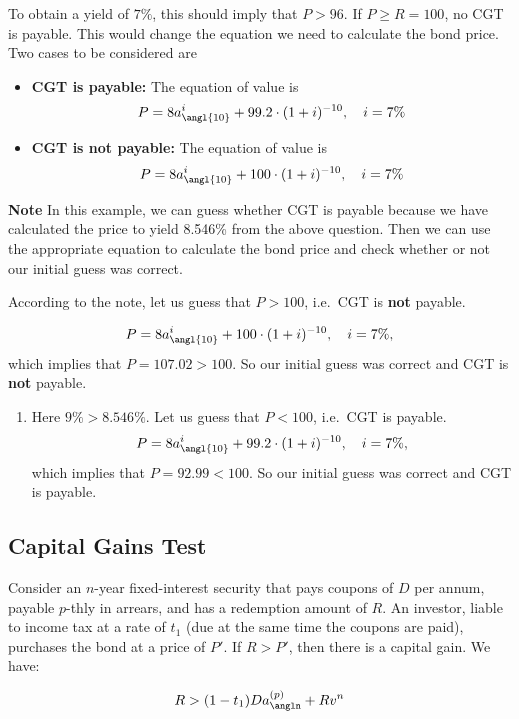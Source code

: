 \documentclass[
]{book}
\providecommand{\tightlist}{%
  \setlength{\itemsep}{0pt}\setlength{\parskip}{0pt}}
\theoremstyle{definition}
\theoremstyle{definition}
\theoremstyle{definition}
\theoremstyle{definition}
\theoremstyle{remark}
\begin{document}
To obtain a yield of \(7\%\), this should imply that \(P > 96\). If
\(P \ge R = 100\), no CGT is payable. This would change the equation we
need to calculate the bond price. Two cases to be considered are

\begin{itemize}
\item
  \textbf{CGT is payable:} The equation of value is
  \[ P = 8 a^i_{\angl{10}} +  99.2\cdot (1+i)^{-10}, \quad i = 7\%\]
\item
  \textbf{CGT is not payable:} The equation of value is
  \[ P = 8 a^i_{\angl{10}} +  100\cdot (1+i)^{-10}, \quad i = 7\%\]
\end{itemize}

\textbf{Note} In this example, we can guess whether CGT is payable because we
have calculated the price to yield 8.546\% from the above question. Then
we can use the appropriate equation to calculate the bond price and
check whether or not our initial guess was correct.

According to the note, let us guess that \(P > 100\), i.e.~CGT is \textbf{not}
payable.

\[ P = 8 a^i_{\angl{10}} +  100\cdot (1+i)^{-10}, \quad i = 7\%,\] which
implies that \(P = 107.02 > 100\). So our initial guess was correct and
CGT is \textbf{not} payable.

\begin{enumerate}
\def\labelenumi{\arabic{enumi}.}
\setcounter{enumi}{2}
\tightlist
\item
  Here \(9\% > 8.546\%\). Let us guess that \(P < 100\), i.e.~CGT is
  payable.
  \[ P = 8 a^i_{\angl{10}} +  99.2\cdot (1+i)^{-10}, \quad i = 7\%,\]
  which implies that \(P = 92.99 < 100\). So our initial guess was
  correct and CGT is payable.
\end{enumerate}

\subsection{Capital Gains Test}\label{capital-gains-test}

Consider an \(n\)-year fixed-interest security that pays coupons of \(D\) per annum, payable \(p\)-thly in arrears, and has a redemption amount of \(R\). An investor, liable to income tax at a rate of \(t_1\) (due at the same time the coupons are paid), purchases the bond at a price of \(P'\). If \(R > P'\), then there is a capital gain. We have:

\[
R > (1 - t_1) D a_{\angln}^{(p)} + R v^n
\]
\end{document}
